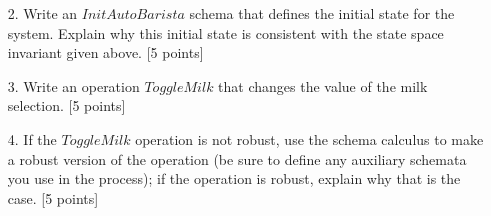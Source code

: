 \documentclass[12pt,fleqn]{article}
\begin{document}
\begin{enumerate}
\begin{enumerate}
\begin{schema}{AutoBarista}
espresso : Espresso\\
milk : Milk\\
flavour : Flavour
\where
\color{blue}
if milk = no\_milk then flavour = no\_flavour
\end{schema}

\item[2.] Write an $InitAutoBarista$ schema that defines the initial state for the system. Explain why this initial state is consistent with the state space invariant given above. [5 points]




\clearpage

\item[3.] Write an operation $ToggleMilk$ that changes the value of the milk selection. [5 points]

\vspace{3in} %


\item[4.] If the $ToggleMilk$ operation is not robust, use the schema calculus to make a robust version of the operation (be sure to define any auxiliary schemata you use in the process); if the operation is robust, explain why that is the case. [5 points]





\end{enumerate}

\end{enumerate}
\end{document}

